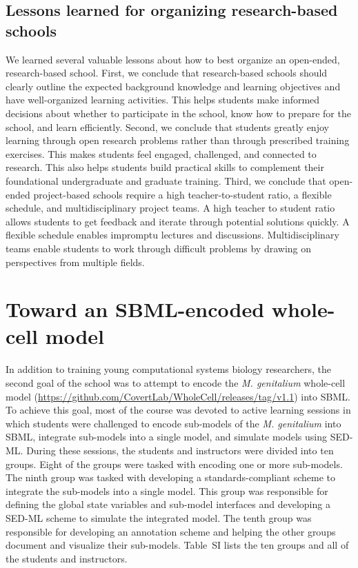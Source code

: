 \documentclass[journal,transmag]{IEEEtran}
\begin{document}
\subsection{Lessons learned for organizing research-based schools}
We learned several valuable lessons about how to best organize an open-ended, research-based school. First, we conclude that research-based schools should clearly outline the expected background knowledge and learning objectives and have well-organized learning activities. This helps students make informed decisions about whether to participate in the school, know how to prepare for the school, and learn efficiently.
Second, we conclude that students greatly enjoy learning through open research problems rather than through prescribed training exercises. This makes students feel engaged, challenged, and connected to research. This also helps students build practical skills to complement their foundational undergraduate and graduate training.
Third, we conclude that open-ended project-based schools require a high teacher-to-student ratio, a flexible schedule, and multidisciplinary project teams. A high teacher to student ratio allows students to get feedback and iterate through potential solutions quickly. A flexible schedule enables impromptu lectures and discussions. Multidisciplinary teams enable students to work through difficult problems by drawing on perspectives from multiple fields. 

\section{Toward an SBML-encoded whole-cell model}
In addition to training young computational systems biology researchers, the second goal of the school was to attempt to encode the \textit{M. genitalium} whole-cell model (\url{https://github.com/CovertLab/WholeCell/releases/tag/v1.1}) into SBML. To achieve this goal, most of the course was devoted to active learning sessions in which students were challenged to encode sub-models of the \textit{M. genitalium} into SBML, integrate sub-models into a single model, and simulate models using SED-ML. During these sessions, the students and instructors were divided into ten groups. Eight of the groups were tasked with encoding one or more sub-models. The ninth group was tasked with developing a standards-compliant scheme to integrate the sub-models into a single model. This group was responsible for defining the global state variables and sub-model interfaces and developing a SED-ML scheme to simulate the integrated model. The tenth group was responsible for developing an annotation scheme and helping the other groups document and visualize their sub-models. Table~SI lists the ten groups and all of the students and instructors. 
\end{document}
